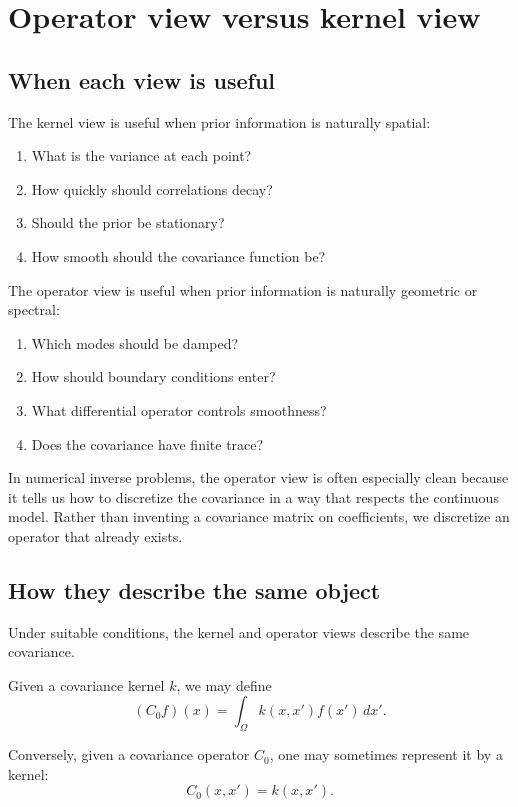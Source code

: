 \documentclass[11pt,a4paper]{book}
\begin{document}
\section{Operator view versus kernel view}

\subsection{When each view is useful}

The kernel view is useful when prior information is naturally spatial:
\begin{enumerate}[label=\arabic*.]
    \item What is the variance at each point?
    \item How quickly should correlations decay?
    \item Should the prior be stationary?
    \item How smooth should the covariance function be?
\end{enumerate}

The operator view is useful when prior information is naturally geometric or
spectral:
\begin{enumerate}[label=\arabic*.]
    \item Which modes should be damped?
    \item How should boundary conditions enter?
    \item What differential operator controls smoothness?
    \item Does the covariance have finite trace?
\end{enumerate}

In numerical inverse problems, the operator view is often especially clean
because it tells us how to discretize the covariance in a way that respects the
continuous model. Rather than inventing a covariance matrix on coefficients, we
discretize an operator that already exists.

\subsection{How they describe the same object}

Under suitable conditions, the kernel and operator views describe the same
covariance.

Given a covariance kernel $k$, we may define
\[
    (C_0 f)(x)
    =
    \int_\Omega k(x,x')f(x')\,dx'.
\]

Conversely, given a covariance operator $C_0$, one may sometimes represent it
by a kernel:
\[
    C_0(x,x') = k(x,x').
\]
\end{document}
